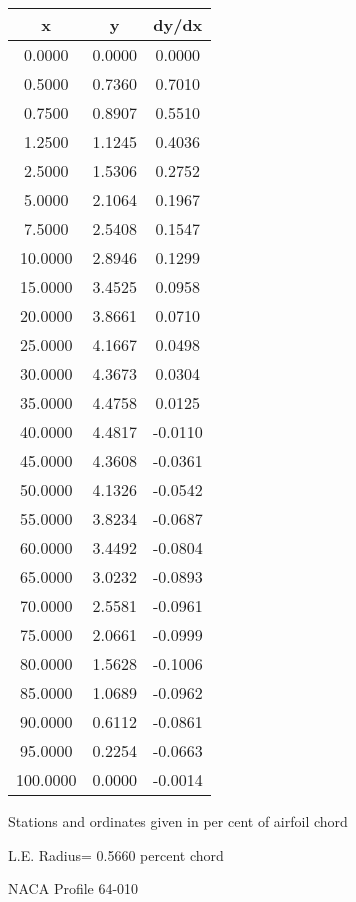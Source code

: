 \documentclass[11pt]{book}
\begin{document}
 \vspace{8mm}
 \begin{tabular}{|c|c|c|} \hline 
  x  &  y  &  dy/dx \\
 \hline
0.0000 & 0.0000 & 0.0000 \\
0.5000 & 0.7360 & 0.7010 \\
0.7500 & 0.8907 & 0.5510 \\
1.2500 & 1.1245 & 0.4036 \\
2.5000 & 1.5306 & 0.2752 \\
5.0000 & 2.1064 & 0.1967 \\
7.5000 & 2.5408 & 0.1547 \\
10.0000 & 2.8946 & 0.1299 \\
15.0000 & 3.4525 & 0.0958 \\
20.0000 & 3.8661 & 0.0710 \\
25.0000 & 4.1667 & 0.0498 \\
30.0000 & 4.3673 & 0.0304 \\
35.0000 & 4.4758 & 0.0125 \\
40.0000 & 4.4817 & -0.0110 \\
45.0000 & 4.3608 & -0.0361 \\
50.0000 & 4.1326 & -0.0542 \\
55.0000 & 3.8234 & -0.0687 \\
60.0000 & 3.4492 & -0.0804 \\
65.0000 & 3.0232 & -0.0893 \\
70.0000 & 2.5581 & -0.0961 \\
75.0000 & 2.0661 & -0.0999 \\
80.0000 & 1.5628 & -0.1006 \\
85.0000 & 1.0689 & -0.0962 \\
90.0000 & 0.6112 & -0.0861 \\
95.0000 & 0.2254 & -0.0663 \\
100.0000 & 0.0000 & -0.0014 \\
 \hline
 \end{tabular}
 \vspace{8mm}


Stations and ordinates given in per cent of airfoil chord 


L.E. Radius=  0.5660 percent chord
 \newpage
  \label{p64-010}
 \begin{Large}
 NACA Profile 64-010
 \end{Large}
  
\end{document}
